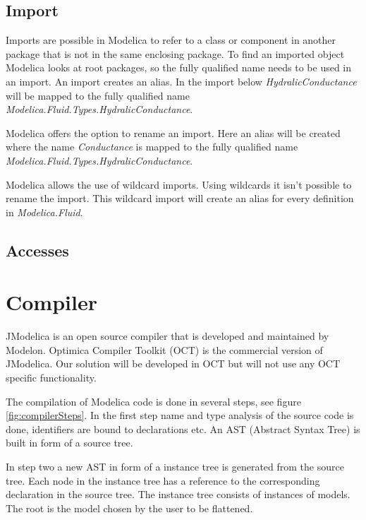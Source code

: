 \documentclass{cslthse-msc}
\begin{document}
\subsection{Import}
Imports are possible in Modelica to refer to a class or component in another package that is not in the same enclosing package. To find an imported object Modelica looks at root packages, so the fully qualified name needs to be used in an import. An import creates an alias. In the import below \textit{HydralicConductance} will be mapped to the fully qualified name \textit{Modelica.Fluid.Types.HydralicConductance}.



Modelica offers the option to rename an import. Here an alias will be created where the name \textit{Conductance} is mapped to the fully qualified name \textit{Modelica.Fluid.Types.HydralicConductance}.



Modelica allows the use of wildcard imports. Using wildcards it isn't possible to rename the import. This wildcard import will create an alias for every definition in \textit{Modelica.Fluid}.



\subsection{Accesses}

\section{Compiler}
JModelica is an open source compiler that is developed and maintained by Modelon. Optimica Compiler Toolkit (OCT) is the commercial version of JModelica. Our solution will be developed in OCT but will not use any OCT specific functionality. 

The compilation of Modelica code is done in several steps, see figure \ref{fig:compilerSteps}. In the first step name and type analysis of the source code is done, identifiers are bound to declarations etc. An AST (Abstract Syntax Tree) is built in form of a source tree.


In step two a new AST in form of a instance tree is generated from the source tree. Each node in the instance tree has a reference to the corresponding declaration in the source tree. The instance tree consists of instances of models. The root is the model chosen by the user to be flattened.
\end{document}
